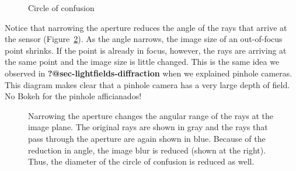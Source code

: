 \documentclass[
  letterpaper,
]{book}
\begin{document}
\begin{figure}


\caption{\label{fig-optics-coc1}Circle of confusion}

\end{figure}%

Notice that narrowing the aperture reduces the angle of the rays that
arrive at the sensor (Figure~\ref{fig-optics-coc2}). As the angle
narrows, the image size of an out-of-focus point shrinks. If the point
is already in focus, however, the rays are arriving at the same point
and the image size is little changed. This is the same idea we observed
in \textbf{?@sec-lightfields-diffraction} when we explained pinhole
cameras. This diagram makes clear that a pinhole camera has a very large
depth of field. No Bokeh for the pinhole afficianados!

\begin{figure}


\caption{\label{fig-optics-coc2}Narrowing the aperture changes the
angular range of the rays at the image plane. The original rays are
shown in gray and the rays that pass through the aperture are again
shown in blue. Because of the reduction in angle, the image blur is
reduced (shown at the right). Thus, the diameter of the circle of
confusion is reduced as well.}

\end{figure}%
\end{document}
